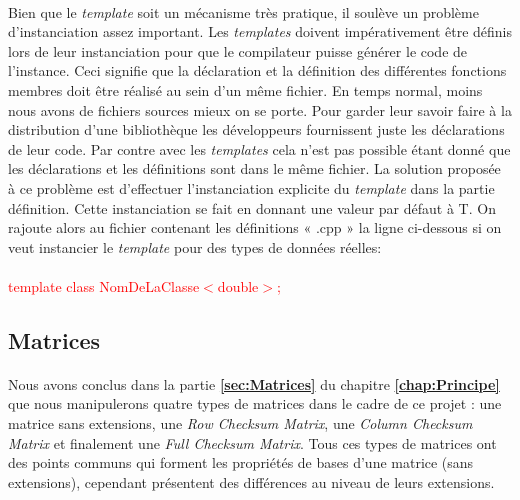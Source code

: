\documentclass[a4paper, 10pt]{report}
\begin{document}
\paragraph*{}
Bien que le \textit{template} soit un mécanisme très pratique, il soulève un problème d’instanciation assez important. 
Les \textit{templates} doivent impérativement être définis lors de leur instanciation pour que le compilateur puisse générer 
le code de l’instance. Ceci signifie que la déclaration et la définition des différentes fonctions membres doit être réalisé 
au sein d’un même fichier. En temps normal, moins nous avons de fichiers sources mieux on se porte. Pour garder leur savoir 
faire à la distribution d’une bibliothèque les développeurs fournissent juste les déclarations de leur code. Par contre 
avec les \textit{templates} cela n’est pas possible étant donné que les déclarations et les définitions sont dans le même 
fichier.\newline
La solution proposée à ce problème est d’effectuer l’instanciation explicite du \textit{template} dans la partie 
définition. Cette instanciation se fait en donnant une valeur par défaut à T. On rajoute alors au fichier contenant 
les définitions « .cpp » la ligne ci-dessous si on veut instancier le \textit{template} pour des types de données réelles:\paragraph*{}
\textcolor{red}{template class NomDeLaClasse$<$double$>$;}
\subsection{Matrices}
\paragraph*{}
Nous avons conclus dans la partie \textbf{\ref{sec:Matrices}} du chapitre \textbf{\ref{chap:Principe}} que nous manipulerons quatre types de matrices dans le cadre 
de ce projet : 
une matrice sans extensions, une \textit{Row Checksum Matrix}, une \textit{Column Checksum Matrix} et finalement une 
\textit{Full Checksum Matrix}. Tous ces types de matrices ont des points communs qui forment les propriétés de bases 
d’une matrice (sans extensions), cependant présentent des différences au niveau de leurs extensions.
\end{document}
